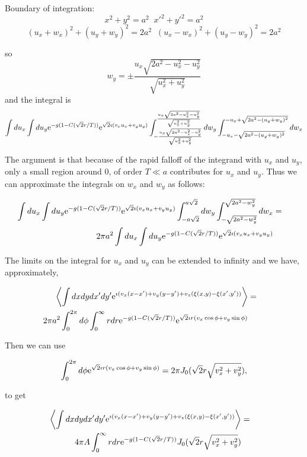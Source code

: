 \documentclass[11pt]{article}
\newcommand{\e}{{\rm e}}
\begin{document}
{{{{Boundary of integration:
$$x^{2}+y^{2}=a^{2}\;\;x'^{2}+y'^{2}=a^{2}$$
$$(u_{x}+w_{x})^{2}+(u_{y}+w_{y})^{2}=2a^{2}\;\;(u_{x}-w_{x})^{2}+(u_{y}-w_{y})^{2}=2a^{2}$$

so
$$w_{y}=\pm\frac{u_{x}\sqrt{2a^{2}-u_{x}^{2}-u_y^{2}}}{\sqrt{u_{x}^{2}+u_{y}^{2}}}$$
and
 the integral is
$$\int du_{x} \int du_{y}\e^{-g(1-C(\sqrt{2}r/T))}\e^{\sqrt{2}\imath( v_{x}u_{x}+v_{y}u_{y})}\int_{-\frac{u_{x}\sqrt{2a^{2}-u_{x}^{2}-u_y^{2}}}{\sqrt{u_{x}^{2}+u_{y}^{2}}}}^{\frac{u_{x}\sqrt{2a^{2}-u_{x}^{2}-u_y^{2}}}{\sqrt{u_{x}^{2}+u_{y}^{2}}}} dw_{y}\int_{-u_{x}-\sqrt{2a^{2}-(u_{y}+w_{y})^{2}}}^{-u_{x}+\sqrt{2a^{2}-(u_{y}+w_{y})^{2}}}dw_{x}$$

The argument is that because of the rapid falloff of the integrand with $u_{x}$ and $u_{y}$, only a small region around 0, of order $T\ll a$ contributes for $u_{x}$ and $u_{y}$. Thus we can approximate the integrals on $w_{x}$ and $w_{y}$ as follows:

\begin{eqnarray}
\int du_{x} \int du_{y}\e^{-g(1-C(\sqrt{2}r/T))}\e^{\sqrt{2}\imath( v_{x}u_{x}+v_{y}u_{y})}\int_{-a\sqrt{2}}^{a\sqrt{2}}dw_{y}\int_{-\sqrt{2a^{2}-w_{y}^{2}}}^{\sqrt{2a^{2}-w_{y}^{2}}}dw_{x}&=&\\
2\pi a^{2}\int du_{x} \int du_{y}\e^{-g(1-C(\sqrt{2}r/T))}\e^{\sqrt{2}\imath( v_{x}u_{x}+v_{y}u_{y})}\end{eqnarray}


The limits on the integral for $u_{x}$ and $u_{y}$ can be extended to infinity and we have, approximately,

\begin{eqnarray}
\left<\int dx dydx'dy'\e^{\imath( v_{x}(x-x')+v_{y}(y-y')+v_{z}(\xi(x,y)-\xi(x',y'))}\right>&=&\\
2\pi a^{2}\int_{0}^{2\pi} d\phi\int_{0}^{\infty} r dr\e^{-g(1-C(\sqrt{2}r/T))}\e^{\sqrt{2}\imath r(v_{x}\cos\phi+v_{y}\sin\phi)}\end{eqnarray}

Then we can use

$$\int_{0}^{2\pi} d\phi\e^{\sqrt{2}\imath r(v_{x}\cos\phi+v_{y}\sin\phi)}=2\pi J_{0}(\sqrt{2}r\sqrt{v_{x}^{2}+v_{y}^{2}}),$$

to get

\begin{eqnarray}
\left<\int dx dydx'dy'\e^{\imath( v_{x}(x-x')+v_{y}(y-y')+v_{z}(\xi(x,y)-\xi(x',y'))}\right>&=&\\
4\pi A\int_{0}^{\infty} r dr\e^{-g(1-C(\sqrt{2}r/T))} J_{0}(\sqrt{2}r\sqrt{v_{x}^{2}+v_{y}^{2}})\end{eqnarray}

}}}}
\end{document}
